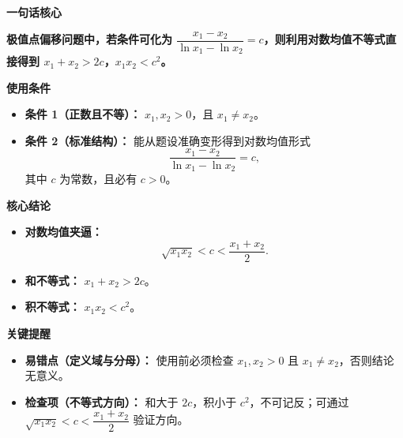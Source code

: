 \begin{summarybox}
	\textbf{\textcolor{CSummary}{一句话核心}}

	\textbf{极值点偏移问题中，若条件可化为 $\dfrac{x_1-x_2}{\ln x_1-\ln x_2}=c$，则利用对数均值不等式直接得到 $x_1+x_2>2c$，$x_1x_2<c^2$。}

	\medskip
	\textbf{\textcolor{CSummary}{使用条件}}
	\begin{itemize}[leftmargin=*, itemsep=0.5em, topsep=0.4em]
		\item \textbf{条件 1（正数且不等）：} $x_1,x_2>0$，且 $x_1\neq x_2$。
		\item \textbf{条件 2（标准结构）：} 能从题设准确变形得到对数均值形式
		      \[
			      \frac{x_1-x_2}{\ln x_1-\ln x_2}=c,
		      \]
		      其中 $c$ 为常数，且必有 $c>0$。
	\end{itemize}

	\medskip
	\textbf{\textcolor{CSummary}{核心结论}}
	\begin{itemize}[leftmargin=*, itemsep=0.5em, topsep=0.4em]
		\item \textbf{对数均值夹逼：}
		      \[
			      \sqrt{x_1x_2}<c<\frac{x_1+x_2}{2}.
		      \]
		\item \textbf{和不等式：} $x_1+x_2>2c$。
		\item \textbf{积不等式：} $x_1x_2<c^2$。
	\end{itemize}

	\medskip
	\textbf{\textcolor{CSummary}{关键提醒}}
	\begin{itemize}[leftmargin=*, itemsep=0.5em, topsep=0.4em]
		\item \textbf{易错点（定义域与分母）：} 使用前必须检查 $x_1,x_2>0$ 且 $x_1\neq x_2$，否则结论无意义。
		\item \textbf{检查项（不等式方向）：} 和大于 $2c$，积小于 $c^2$，不可记反；可通过 $\sqrt{x_1x_2}<c<\dfrac{x_1+x_2}{2}$ 验证方向。
	\end{itemize}
\end{summarybox}